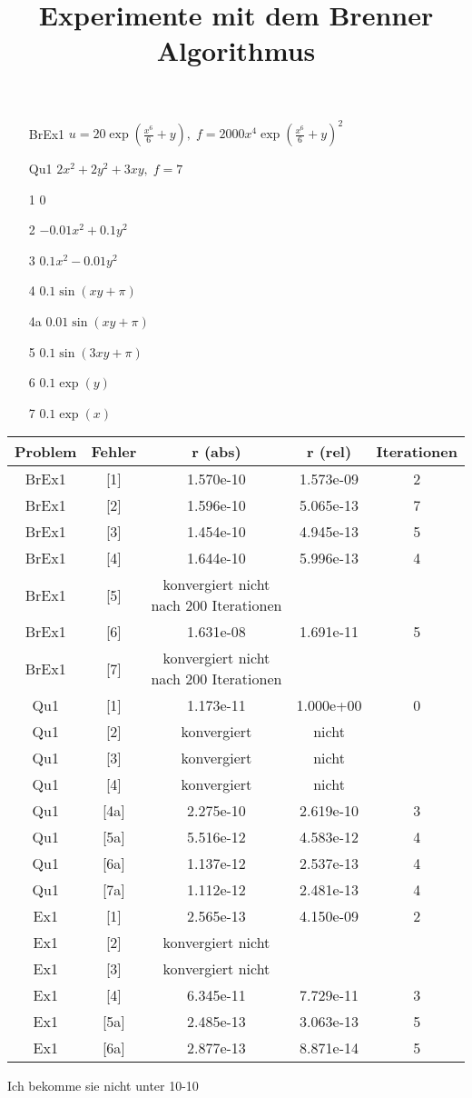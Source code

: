 \documentclass[a4paper,11pt]{article}
\title{Experimente mit dem Brenner Algorithmus}
\begin{document}
\maketitle

\begin{enumerate}
	\item [BrEx1]  $u = 20\exp(\frac {x^6} 6 +y), \; f = 2000 x^4{\exp(\frac {x^6} 6 +y)}^2 $
	\item [Qu1] $2x^2+2y^2+3xy, \; f = 7$
\end{enumerate}

\begin{enumerate}
	\item [1] $0$
  \item [2]	$-0.01x^2+0.1y^2$
	\item [3] $0.1x^2-0.01y^2$
	\item [4] $0.1\sin(xy+\pi)$
	\item [4a] $0.01\sin(xy+\pi)$
	\item [5] $0.1\sin(3xy+\pi)$
	\item [6] $0.1\exp(y)$ 
	\item [7] $0.1\exp(x)$ 
\end{enumerate}

\begin{tabular}{ccccc}
Problem & Fehler &  r (abs) & r (rel) & Iterationen  \\ 
\hline
BrEx1   & [1]    & 1.570e-10 & 1.573e-09 & 2  \\
BrEx1   & [2]    & 1.596e-10 &  5.065e-13 & 7  \\
BrEx1   & [3]    & 1.454e-10 &  4.945e-13 & 5  \\
BrEx1   & [4]    & 1.644e-10 &  5.996e-13 & 4  \\
BrEx1   & [5]    & konvergiert nicht nach 200 Iterationen \\
BrEx1   & [6]    & 1.631e-08 &  1.691e-11 & 5  \\
BrEx1   & [7]    & konvergiert nicht nach 200 Iterationen \\
\hline
Qu1  & [1] & 1.173e-11 & 1.000e+00 & 0\\
Qu1  & [2] & konvergiert & nicht \\
Qu1  & [3] & konvergiert & nicht \\
Qu1  & [4] & konvergiert & nicht \\
Qu1  & [4a] & 2.275e-10 &  2.619e-10 & 3 \\
Qu1  & [5a] & 5.516e-12 &  4.583e-12 & 4 \\
Qu1  & [6a] & 1.137e-12 & 2.537e-13 & 4  \\
Qu1  & [7a] & 1.112e-12 &2.481e-13 &  4 \\
\hline
Ex1  &  [1] & 2.565e-13 & 4.150e-09 &2 \\
Ex1  &  [2] & konvergiert nicht & &  \\
Ex1  &  [3] & konvergiert nicht & &\\
Ex1  &  [4] & 6.345e-11 & 7.729e-11 & 3 \\
Ex1  &  [5a] & 2.485e-13 & 3.063e-13 & 5 \\
Ex1  &  [6a] & 2.877e-13 & 8.871e-14 & 5 
\end{tabular}


Ich bekomme sie nicht unter 10-10
\end{document}
